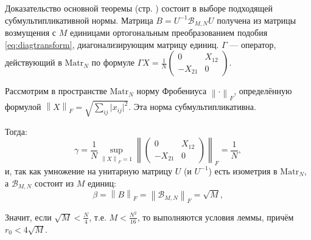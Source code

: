 Доказательство основной теоремы (стр. \pageref{thm:almostallones-spectra})
состоит в выборе подходящей субмультипликативной нормы.
Матрица \( B = U^{-1} \mathscr{B}_{M,N} U \)
получена из матрицы возмущения с \( M \) единицами
ортогональным преобразованием подобия \eqref{eq:diagtransform},
диагонализирующим матрицу единиц.
\( \Gamma \) --- оператор, действующий в \( \mathrm{Matr}_{N} \)
по формуле
\( { \Gamma X = \frac1N \begin{pmatrix}0 & X_{12} \\ -X_{21} & 0\end{pmatrix} } \).

Рассмотрим в пространстве \( \mathrm{Matr}_{N} \)
норму Фробениуса \( {\left\|\cdot\right\|}_{F} \),
определённую формулой
\( {\left\|X\right\|}_{F} = \sqrt{\sum_{ij} \lvert x_{ij}\rvert^2}. \)
Эта норма субмультипликативна.

Тогда:
\[ \gamma = \frac1N
            \sup_{{\left\|X\right\|}_{F}=1}{\left\|\begin{pmatrix}0 & X_{12} \\ -X_{21} & 0\end{pmatrix}\right\|}_{F}
          = \frac1N,
    \]
и, так как умножение на унитарную матрицу \( U \)
    (и \( U^{-1} \)) есть изометрия в \( \mathrm{Matr}_{N} \),
    а \( \mathscr{B}_{M,N} \) состоит из \( M \) единиц:
\[
    \beta = {\left\|B\right\|}_{F} =
    {\left\|\mathscr{B}_{M,N}\right\|}_{F} = \sqrt{M},
    \]

Значит, если
\( \sqrt{M} < \frac{N}{4} \), т.е.
\( M < \frac{N^2}{16} \),
то выполняются условия леммы,
причём \( r_0 < 4\sqrt{M} \).
